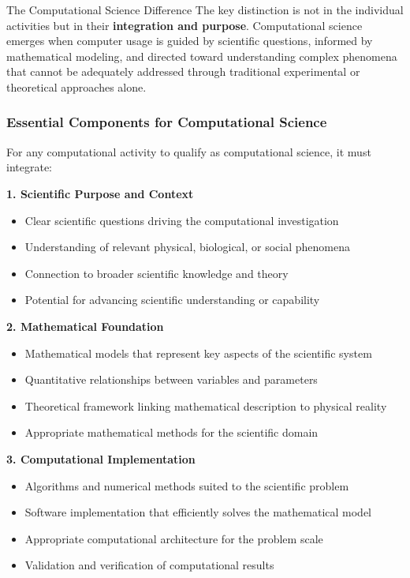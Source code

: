 \begin{highlightbox}{The Computational Science Difference}
The key distinction is not in the individual activities but in their \textbf{integration and purpose}. Computational science emerges when computer usage is guided by scientific questions, informed by mathematical modeling, and directed toward understanding complex phenomena that cannot be adequately addressed through traditional experimental or theoretical approaches alone.
\end{highlightbox}

\subsubsection{Essential Components for Computational Science}

For any computational activity to qualify as computational science, it must integrate:

\textbf{1. Scientific Purpose and Context}
\begin{itemize}
    \item Clear scientific questions driving the computational investigation
    \item Understanding of relevant physical, biological, or social phenomena
    \item Connection to broader scientific knowledge and theory
    \item Potential for advancing scientific understanding or capability
\end{itemize}

\textbf{2. Mathematical Foundation}
\begin{itemize}
    \item Mathematical models that represent key aspects of the scientific system
    \item Quantitative relationships between variables and parameters
    \item Theoretical framework linking mathematical description to physical reality
    \item Appropriate mathematical methods for the scientific domain
\end{itemize}

\textbf{3. Computational Implementation}
\begin{itemize}
    \item Algorithms and numerical methods suited to the scientific problem
    \item Software implementation that efficiently solves the mathematical model
    \item Appropriate computational architecture for the problem scale
    \item Validation and verification of computational results
\end{itemize}

